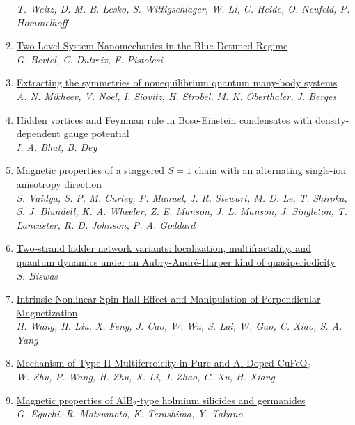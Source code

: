 \documentclass{article}
\begin{document}
\begin{enumerate}
{\small\color{blue}\textsl{T. Weitz, D. M. B. Lesko, S. Wittigschlager, W. Li, C. Heide, O. Neufeld, P. Hommelhoff}}
\item\href{http://arxiv.org/abs/2407.17916v1}{\textsf{Two-Level System Nanomechanics in the Blue-Detuned Regime}}\\
{\small\color{blue}\textsl{G. Bertel, C. Dutreix, F. Pistolesi}}
\item\href{http://arxiv.org/abs/2407.17913v1}{\textsf{Extracting the symmetries of nonequilibrium quantum many-body systems}}\\
{\small\color{blue}\textsl{A. N. Mikheev, V. Noel, I. Siovitz, H. Strobel, M. K. Oberthaler, J. Berges}}
\item\href{http://arxiv.org/abs/2407.17901v1}{\textsf{Hidden vortices and Feynman rule in Bose-Einstein condensates with
  density-dependent gauge potential}}\\
{\small\color{blue}\textsl{I. A. Bhat, B. Dey}}
\item\href{http://arxiv.org/abs/2407.17894v1}{\textsf{Magnetic properties of a staggered $S=1$ chain with an alternating
  single-ion anisotropy direction}}\\
{\small\color{blue}\textsl{S. Vaidya, S. P. M. Curley, P. Manuel, J. R. Stewart, M. D. Le, T. Shiroka, S. J. Blundell, K. A. Wheeler, Z. E. Manson, J. L. Manson, J. Singleton, T. Lancaster, R. D. Johnson, P. A. Goddard}}
\item\href{http://arxiv.org/abs/2407.17871v1}{\textsf{Two-strand ladder network variants: localization, multifractality, and
  quantum dynamics under an Aubry-André-Harper kind of quasiperiodicity}}\\
{\small\color{blue}\textsl{S. Biswas}}
\item\href{http://arxiv.org/abs/2407.17867v1}{\textsf{Intrinsic Nonlinear Spin Hall Effect and Manipulation of Perpendicular
  Magnetization}}\\
{\small\color{blue}\textsl{H. Wang, H. Liu, X. Feng, J. Cao, W. Wu, S. Lai, W. Gao, C. Xiao, S. A. Yang}}
\item\href{http://arxiv.org/abs/2407.17859v1}{\textsf{Mechanism of Type-II Multiferroicity in Pure and Al-Doped CuFeO$_2$}}\\
{\small\color{blue}\textsl{W. Zhu, P. Wang, H. Zhu, X. Li, J. Zhao, C. Xu, H. Xiang}}
\item\href{http://arxiv.org/abs/2407.17830v1}{\textsf{Magnetic properties of AlB$_2$-type holmium silicides and germanides}}\\
{\small\color{blue}\textsl{G. Eguchi, R. Matsumoto, K. Terashima, Y. Takano}}

\end{enumerate}
\end{document}

